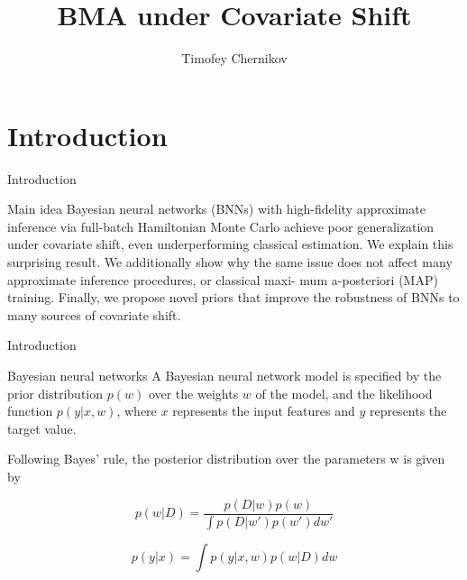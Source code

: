 \documentclass{beamer}
\title{BMA under Covariate Shift}
\author{Timofey Chernikov}
\institute{MIPT, 2023}
\begin{document}
\begin{frame}
    \titlepage
\end{frame}




\section{Introduction}
\begin{frame}{Introduction}
    \begin{block}{Main idea}
        Bayesian neural networks (BNNs) with high-fidelity approximate
        inference via full-batch Hamiltonian Monte Carlo achieve poor generalization
        under covariate shift, even underperforming classical estimation.
        We explain this surprising result. We additionally show why the same
        issue does not affect many approximate inference procedures, or classical maxi-
        mum a-posteriori (MAP) training. Finally, we propose novel priors that improve
        the robustness of BNNs to many sources of covariate shift.
    \end{block} 
\end{frame}

\begin{frame}{Introduction}
    \begin{block}{Bayesian neural networks}
        A Bayesian neural network model is specified by the prior distribution
        $p(w)$ over the weights $w$ of the model, and the likelihood function $p(y|x, w)$, where $x$ represents the
        input features and $y$ represents the target value.

        Following Bayes’ rule, the posterior distribution over the parameters w is given by

        $$ p(w|D) = \frac {p(D|w)p(w)} {\int p(D|w')p(w')dw'} $$

        $$ p(y|x) = \int p(y|x,w)p(w|D)dw $$
    \end{block} 
\end{frame}
\end{document}
